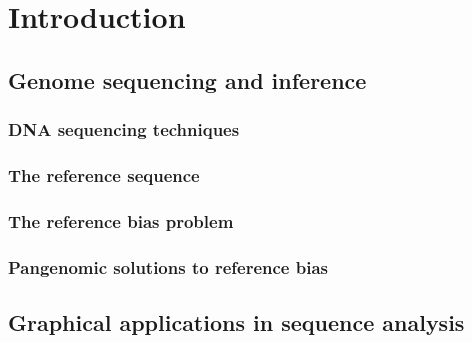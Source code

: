 
\chapter{Introduction}  %

\ifpdf
    \graphicspath{{Chapter1/Figs/Raster/}{Chapter1/Figs/PDF/}{Chapter1/Figs/}}
\else
    \graphicspath{{Chapter1/Figs/Vector/}{Chapter1/Figs/}}
\fi


\section{Genome sequencing and inference}

\subsection{DNA sequencing techniques}


\subsection{The reference sequence}


\subsection{The reference bias problem}


\subsection{Pangenomic solutions to reference bias}


\section{Graphical applications in sequence analysis}

